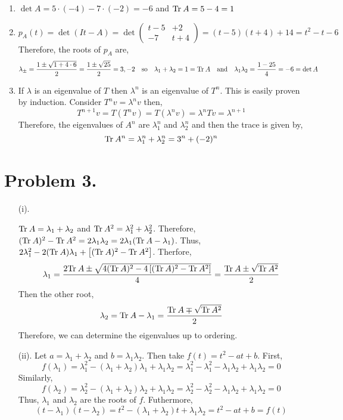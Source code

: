\documentclass[12pt]{extarticle}
\begin{document}
\begin{enumerate}
\item $\det{A} = 5 \cdot (-4) - 7 \cdot (-2) = -6$ and $ \mathrm{Tr} \: A = 5 - 4 = 1$

\item 
\[ p_{A}(t) = \det{\left( I t - A \right)}  = \det{
\begin{pmatrix}
t - 5 & +2 \\
-7 & t + 4
\end{pmatrix}} = (t - 5)(t + 4) + 14 = t^2 - t - 6\] Therefore, the roots of $p_A$ are,
\[ \lambda_{\pm} = \frac{1 \pm \sqrt{1 + 4 \cdot 6}}{2} = \frac{1 \pm \sqrt{25}}{2} = 3, -2 \quad \text{so} \quad \lambda_1 + \lambda_2 = 1 = \mathrm{Tr} \: A \quad \text{and} \quad \lambda_1 \lambda_2 = \frac{1 - 25}{4} = - 6 = \det{A} \] 

\item If $\lambda$ is an eigenvalue of $T$ then $\lambda^n$ is an eigenvalue of $T^n$. This is easily proven by induction. Consider $T^n v = \lambda^n v$ then,
\[T^{n+1} v = T (T^n v) = T (\lambda^n v) = \lambda^n T v = \lambda^{n + 1}\]
Therefore, the eigenvalues of $A^n$ are $\lambda_1^n$ and $\lambda_2^n$ and then the trace is given by,
\[ \mathrm{Tr} \: A^n = \lambda_1^n + \lambda_2^n = 3^n + (-2)^n\] 

\end{enumerate}

\section*{Problem 3.}

\begin{enumerate}
\item[(i).] 

$\mathrm{Tr} \: A = \lambda_1 + \lambda_2$ and $\mathrm{Tr} \: A^2 = \lambda_1^2 + \lambda_2^2$. Therefore, $(\mathrm{Tr} \: A)^2 - \mathrm{Tr} \: A^2 = 2 \lambda_1 \lambda_2 = 2 \lambda_1 (\mathrm{Tr} \: A - \lambda_1)$. Thus, $2 \lambda_1^2 - 2 (\mathrm{Tr} \: A) \lambda_1 + \left[ (\mathrm{Tr} \: A)^2 - \mathrm{Tr} \: A^2 \right]$. Therfore,
\[ \lambda_1 = \frac{2 \mathrm{Tr} \: A \pm \sqrt{4 (\mathrm{Tr} \: A)^2 - 4 \left[ (\mathrm{Tr} \: A)^2 - \mathrm{Tr} \: A^2\right]}}{4} = \frac{\mathrm{Tr} \: A \pm \sqrt{ \mathrm{Tr} \: A^2 }}{2} \]
Then the other root,
\[ \lambda_2 = \mathrm{Tr} \: A - \lambda_1 = \frac{\mathrm{Tr} \: A \mp \sqrt{ \mathrm{Tr} \: A^2 }}{2} \]
Therefore, we can determine the eigenvalues up to ordering. 

\item[(ii).] Let $a = \lambda_1 + \lambda_2$ and $b = \lambda_1 \lambda_2$. Then take $f(t) = t^2 - a t + b$. First, 
\[f(\lambda_1) = \lambda_1^2 - (\lambda_1 + \lambda_2) \lambda_1 + \lambda_1 \lambda_2 = \lambda_1^2 - \lambda_1^2 - \lambda_1 \lambda_2 + \lambda_1 \lambda_2 = 0\]
Similarly,
\[f(\lambda_2) = \lambda_2^2 - (\lambda_1 + \lambda_2) \lambda_2 + \lambda_1 \lambda_2 = \lambda_2^2 - \lambda_2^2 - \lambda_1 \lambda_2 + \lambda_1 \lambda_2 = 0\]
Thus, $\lambda_1$ and $\lambda_2$ are the roots of $f$. Futhermore,
\[ (t - \lambda_1) (t - \lambda_2) = t^2 - (\lambda_1 + \lambda_2) t + \lambda_1 \lambda_2 = t^2 - a t + b = f(t) \]
\end{enumerate}
\end{document}
